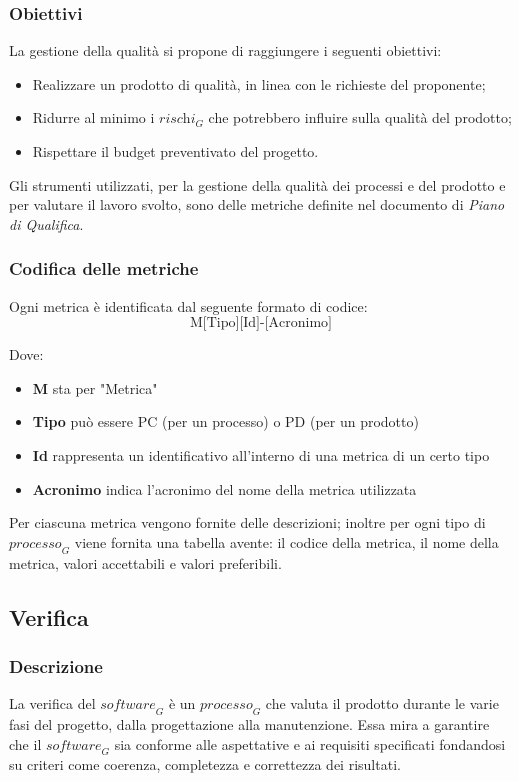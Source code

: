 \subsubsection{Obiettivi}
La gestione della qualità si propone di raggiungere i seguenti obiettivi:
\begin{itemize}
    \item Realizzare un prodotto di qualità, in linea con le richieste del proponente;
    \item Ridurre al minimo i $\textit{rischi}_G$ che potrebbero influire sulla qualità del prodotto;
    \item Rispettare il budget preventivato del progetto.
\end{itemize}
Gli strumenti utilizzati, per la gestione della qualità dei processi e del prodotto e per valutare il lavoro svolto, sono delle metriche definite nel documento di \emph{Piano di Qualifica}. 
\subsubsection{Codifica delle metriche}
Ogni metrica è identificata dal seguente formato di codice:
\[
\text{M[Tipo][Id]-[Acronimo]}
\]

Dove:
\begin{itemize}
    \item \textbf{M} sta per "Metrica"
    \item \textbf{Tipo} può essere PC (per un processo) o PD (per un prodotto)
    \item \textbf{Id} rappresenta un identificativo all'interno di una metrica di un certo tipo
    \item \textbf{Acronimo} indica l'acronimo del nome della metrica utilizzata
\end{itemize}
Per ciascuna metrica vengono fornite delle descrizioni; inoltre per ogni tipo di $\textit{processo}_G$ viene fornita una tabella avente: il codice della metrica, il nome della metrica, valori accettabili e valori preferibili.

\subsection{Verifica}
\subsubsection{Descrizione}
La verifica del $\textit{software}_G$ è un $\textit{processo}_G$ che valuta il prodotto durante le varie fasi del progetto, dalla progettazione alla manutenzione. Essa mira a garantire che il $\textit{software}_G$ sia conforme alle aspettative e ai requisiti specificati fondandosi su criteri come coerenza, completezza e correttezza dei risultati.
